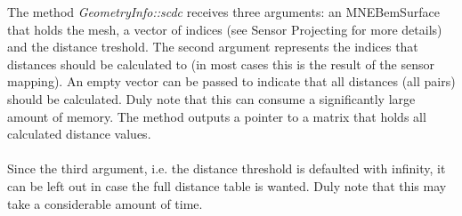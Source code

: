 The method \textit{GeometryInfo::scdc} receives three arguments: an MNEBemSurface that holds the mesh, a vector of indices (see Sensor Projecting for more details) and the distance treshold. The second argument represents the indices that distances should be calculated to (in most cases this is the result of the sensor mapping). An empty vector can be passed to indicate that all distances (all pairs) should be calculated. Duly note that this can consume a significantly large amount of memory. The method outputs a pointer to a matrix that holds all calculated distance values.\\
\\
Since the third argument, i.e. the distance threshold is defaulted with infinity, it can be left out in case the full distance table is wanted. Duly note that this may take a considerable amount of time.

